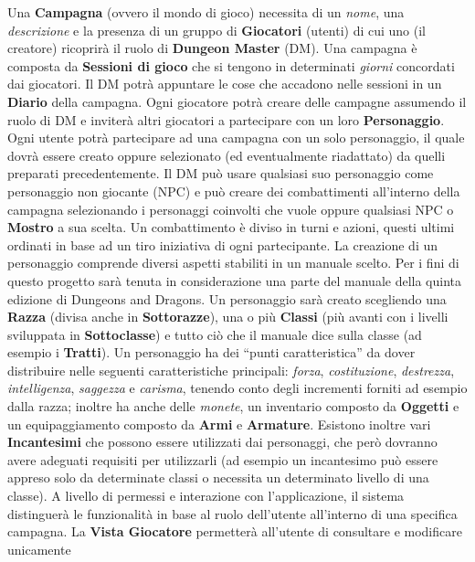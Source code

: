 \documentclass[a4paper,12pt]{report}
\begin{document}
Una \textbf{Campagna} (ovvero il mondo di gioco) necessita di un \textit{nome}, una \textit{descrizione}
e la presenza di un gruppo di \textbf{Giocatori} (utenti) di cui uno (il creatore) ricoprirà il ruolo 
di \textbf{Dungeon Master} (DM).
%
Una campagna è composta da \textbf{Sessioni di gioco} che si tengono in determinati \textit{giorni} 
concordati dai giocatori. Il DM potrà appuntare le cose che accadono nelle sessioni in 
un \textbf{Diario} della campagna.
%
Ogni giocatore potrà creare delle campagne assumendo il ruolo di DM e inviterà altri 
giocatori a partecipare con un loro \textbf{Personaggio}.
%
Ogni utente potrà partecipare ad una campagna con un solo personaggio, il quale dovrà 
essere creato oppure selezionato (ed eventualmente riadattato) da quelli preparati 
precedentemente. 
%
Il DM può usare qualsiasi suo personaggio come personaggio non giocante (NPC) 
e può creare dei combattimenti all'interno della campagna selezionando i personaggi coinvolti che vuole 
oppure qualsiasi NPC o \textbf{Mostro} a sua scelta. 
%
Un combattimento è diviso in turni e azioni,
questi ultimi ordinati in base ad un tiro iniziativa di ogni partecipante. 
La creazione di un personaggio comprende diversi aspetti stabiliti in un manuale scelto.
%
Per i fini di questo progetto sarà tenuta in considerazione una parte del manuale della 
quinta edizione di Dungeons and Dragons. Un personaggio sarà creato scegliendo una \textbf{Razza}
(divisa anche in \textbf{Sottorazze}), una o più \textbf{Classi} 
(più avanti con i livelli sviluppata in \textbf{Sottoclasse}) e tutto ciò che il manuale dice sulla classe 
(ad esempio i \textbf{Tratti}). 
%
Un personaggio ha dei \enquote{punti caratteristica} da dover distribuire nelle 
seguenti caratteristiche principali: 
\textit{forza}, \textit{costituzione}, \textit{destrezza}, \textit{intelligenza}, \textit{saggezza} e 
\textit{carisma}, tenendo conto degli incrementi forniti ad esempio dalla razza; 
%
inoltre ha anche delle \textit{monete}, un inventario composto da \textbf{Oggetti} e un 
equipaggiamento composto da \textbf{Armi} e \textbf{Armature}. 
%
Esistono inoltre vari \textbf{Incantesimi} che possono essere utilizzati
dai personaggi, che però dovranno avere adeguati requisiti per utilizzarli (ad esempio 
un incantesimo può essere appreso solo da determinate classi o necessita un determinato livello di una classe).
%
A livello di permessi e interazione con l'applicazione, il sistema distinguerà 
le funzionalità in base al ruolo dell'utente all'interno di una specifica campagna. 
%
La \textbf{Vista Giocatore} permetterà all'utente di consultare e modificare unicamente 
\end{document}
